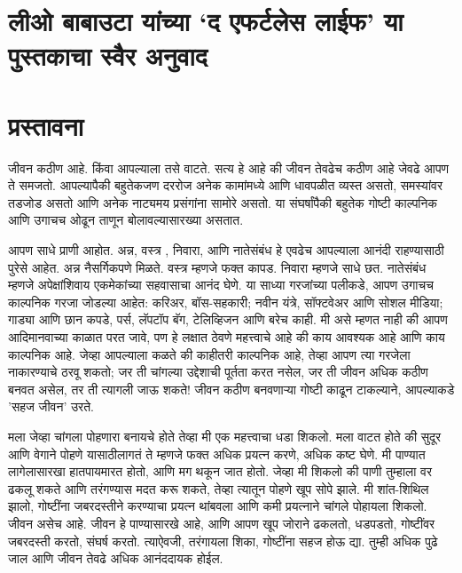 \chapter*{लीओ बाबाउटा यांच्या `द एफर्टलेस लाईफ' या पुस्तकाचा स्वैर अनुवाद}

\chapter{प्रस्तावना}

जीवन कठीण आहे. किंवा आपल्याला तसे वाटते.
सत्य हे आहे की जीवन तेवढेच कठीण आहे जेवढे आपण ते समजतो.
आपल्यापैकी बहुतेकजण दररोज अनेक कामांमध्ये आणि धावपळीत व्यस्त असतो, समस्यांवर तडजोड असतो आणि अनेक नाट्यमय प्रसंगांना सामोरे असतो. या संघर्षांपैकी बहुतेक गोष्टी काल्पनिक आणि उगाचच ओढून ताणून बोलावल्यासारख्या असतात.

आपण साधे प्राणी आहोत. अन्न, वस्त्र ,  निवारा, आणि नातेसंबंध हे एवढेच आपल्याला आनंदी राहण्यासाठी पुरेसे आहेत. अन्न  नैसर्गिकपणे मिळते. वस्त्र म्हणजे फक्त कापड. निवारा म्हणजे साधे छत. नातेसंबंध म्हणजे अपेक्षांशिवाय एकमेकांच्या सहवासाचा आनंद घेणे.
या साध्या गरजांच्या पलीकडे, आपण उगाचच काल्पनिक गरजा जोडल्या आहेत: करिअर, बॉस-सहकारी; नवीन यंत्रे, सॉफ्टवेअर आणि सोशल मीडिया; गाड्या आणि छान कपडे, पर्स, लॅपटॉप बॅग, टेलिव्हिजन आणि बरेच काही.
मी असे म्हणत नाही की आपण आदिमानवाच्या काळात परत जावे, पण हे लक्षात ठेवणे महत्त्वाचे आहे की काय आवश्यक आहे आणि काय काल्पनिक आहे.
जेव्हा आपल्याला कळते की काहीतरी काल्पनिक आहे, तेव्हा आपण त्या गरजेला नाकारण्याचे ठरवू शकतो; जर ती चांगल्या उद्देशाची पूर्तता करत नसेल, जर ती जीवन अधिक कठीण बनवत असेल, तर ती त्यागली जाऊ शकते!
जीवन कठीण बनवणाऱ्या गोष्टी काढून टाकल्याने, आपल्याकडे 'सहज जीवन' उरते.

 मला जेव्हा चांगला पोहणारा बनायचे होते तेव्हा मी एक महत्त्वाचा धडा शिकलो.  मला वाटत होते की सुदूर आणि वेगाने पोहणे यासाठीलागतं ते म्हणजे फक्त अधिक प्रयत्न करणे, अधिक कष्ट घेणे. मी पाण्यात लागेलासारखा हातपायमारत होतो, आणि मग थकून जात होतो. जेव्हा मी शिकलो की पाणी तुम्हाला वर ढकलू शकते आणि तरंगण्यास मदत करू शकते, तेव्हा त्यातून पोहणे खूप सोपे झाले. मी शांत-शिथिल झालो, गोष्टींना जबरदस्तीने करण्याचा प्रयत्न थांबवला आणि कमी प्रयत्नाने चांगले पोहायला शिकलो.
जीवन असेच आहे. जीवन हे पाण्यासारखे आहे, आणि आपण खूप जोराने ढकलतो, धडपडतो, गोष्टींवर  जबरदस्ती करतो, संघर्ष करतो. त्याऐवजी, तरंगायला शिका, गोष्टींना सहज होऊ द्या. तुम्ही अधिक पुढे जाल आणि जीवन तेवढे अधिक आनंददायक होईल.

